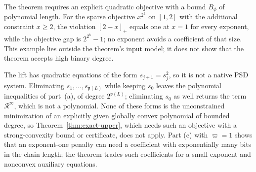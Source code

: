 The theorem requires an explicit quadratic objective with a bound $B_\phi$ of
polynomial length. For the sparse objective $x^{2^k}$ on $[1,2]$ with the
additional constraint $x\ge2$, the violation $[2-x]_+$ equals one at $x=1$
for every exponent, while the objective gap is $2^{2^k}-1$; no exponent
avoids a coefficient of that size. This example lies outside the theorem's
input model; it does not show that the theorem accepts high binary degree.

The lift has quadratic equations of the form $s_{j+1}=s_j^2$, so it is not a
native PSD system. Eliminating $s_1,\ldots,s_{\mathfrak p(L)}$ while keeping
$s_0$ leaves the polynomial inequalities of part~(a), of degree
$2^{\mathfrak p(L)}$; eliminating $s_0$ as well returns the term
$\mathcal R^{\varpi}$, which is not a polynomial. None of these forms is the
unconstrained minimization of an explicitly given globally convex polynomial
of bounded degree, so Theorem~\ref{thm:exact-upper}, which needs such an
objective with a strong-convexity bound or certificate, does not apply.
Part (c) with $\varpi=1$
shows that an exponent-one penalty can need a coefficient with exponentially
many bits in the chain length; the theorem trades such coefficients for a
small exponent and nonconvex auxiliary equations.
